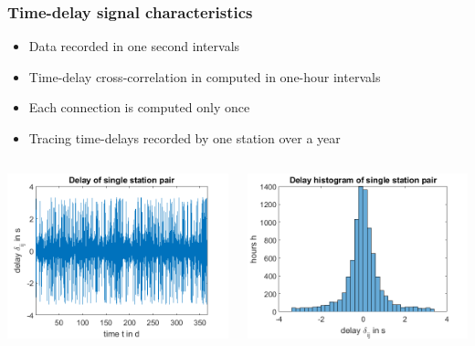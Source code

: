 \documentclass{beamer}
\begin{document}
\begin{frame}
\frametitle{Time-delay signal characteristics}
\begin{itemize}
\item Data recorded in one second intervals
\item Time-delay cross-correlation in computed in one-hour intervals
\item Each connection is computed only once 
\item Tracing time-delays recorded by one station over a year
\end{itemize}

\begin{columns}
\includegraphics[width=\textwidth]{delayevolutionovertimeforonestation2_presentation.png}

\includegraphics[width=\textwidth]{delayevolutionovertimeforonestation_presentation.png}
\end{columns}
\end{frame}
\end{document}
